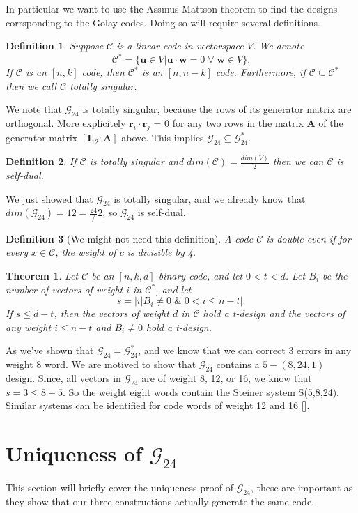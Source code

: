 \documentclass[paper=a4, fontsize=11pt]{scrartcl} %
\numberwithin{equation}{section} %
\numberwithin{figure}{section} %
\numberwithin{table}{section} %
\theoremstyle{break}
\newtheorem{defn}{Definition}
\newtheorem{thm}{Theorem}
\begin{document}
In particular we want to use the Assmus-Mattson theorem to find the designs corrsponding to the Golay codes. Doing so will require several definitions.
\begin{defn}
Suppose $\mathcal{C}$ is a linear code in vectorspace $V$. We denote 
$$\mathcal{C}^* = \{ \bm{u} \in V | \bm{u} \cdot \bm{w} = 0 \; \forall \; \bm{w} \in V \}. $$
If $\mathcal{C}$ is an $[n,k]$ code, then $\mathcal{C}^*$ is an $[n,n-k]$ code.
Furthermore, if $\mathcal{C}\subseteq\mathcal{C}^*$ then we call $\mathcal{C}$ \textit{totally singular}.
\end{defn}
We note that $\mathcal{G}_{24}$ is totally singular, because the rows of its generator matrix are orthogonal.
More explicitely $\bm{r}_i \cdot \bm{r}_j$ = 0 for any two rows in the matrix $\bm{A}$ of the generator matrix $[\bm{I}_{12}:\bm{A}]$ above. This implies $\mathcal{G}_{24} \subseteq \mathcal{G}_{24}^*$.
\begin{defn}
If $\mathcal{C}$ is totally singular and $dim(\mathcal{C})=\frac{dim(V)}{2}$ then we can $\mathcal{C}$ is \textit{self-dual}.
\end{defn}
We just showed that $\mathcal{G}_{24}$ is totally singular, and we already know that $dim(\mathcal{G}_{24}) = 12 = \frac{24}/2$, so $\mathcal{G}_{24}$ is self-dual.
\begin{defn}[We might not need this definition]
A code $\mathcal{C}$ is \textit{double-even} if for every $x\in \mathcal{C}$, the weight of $c$ is divisible by 4.
\end{defn}
\begin{thm}
Let $\mathcal{C}$ be an $[n,k,d]$ binary code, and let $0<t<d$. Let $B_i$ be the number of vectors of weight $i$ in $\mathcal{C}^*$, and let
$$
s = |{i|B_i \not= 0 \; \& \; 0<i\leq n-t}|.
$$
If $s\leq d-t$, then the vectors of weight $d$ in $\mathcal{C}$ hold a t-design and the vectors of any weight $i\leq n-t$ and $B_i\not=0$ hold a t-design.
\end{thm}

As we've shown that $\mathcal{G}_{24}=\mathcal{G}_{24}^*$, and we know that we can correct 3 errors in any weight 8 word. We are motived to show that $\mathcal{G}_{24}$ contains a $5-(8,24,1)$ design. Since, all vectors in $\mathcal{G}_{24}$ are of weight 8, 12, or 16, we know that $s=3 \leq 8-5$. So the weight eight words contain the Steiner system S(5,8,24). Similar systems can be identified for code words of weight 12 and 16 [\cite{pless}]. 

\section{Uniqueness of $\mathcal{G}_{24}$}
This section will briefly cover the uniqueness proof of $\mathcal{G}_{24}$, these are important as they show that our three constructions actually generate the same code.
\end{document}
